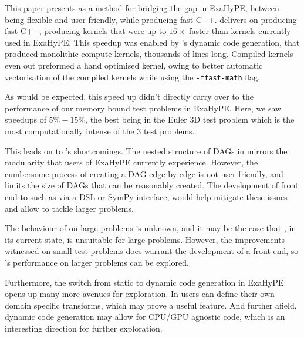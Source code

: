 This paper presents \phlat as a method for bridging the gap in ExaHyPE, between being flexible and user-friendly, while producing fast C++.
\phlat delivers on producing fast C++, producing kernels that were up to $16\times$ faster than kernels currently used in ExaHyPE.
This speedup was enabled by \phlat{}'s dynamic code generation, that produced monolithic compute kernels, thousands of lines long.
Compiled kernels even out preformed a hand optimised kernel, owing to better automatic vectorisation of the compiled kernels while using the \texttt{-ffast-math} flag.

As would be expected, this speed up didn't directly carry over to the performance of our memory bound test problems in ExaHyPE.
Here, we saw speedups of $5\% - 15\%$, the best being in the Euler 3D test problem which is the most computationally intense of the 3 test problems.

This leads on to \phlat{}'s shortcomings.
The nested structure of DAGs in \phlat mirrors the modularity that users of ExaHyPE currently experience.
However, the cumbersome process of creating a DAG edge by edge is not user friendly, and limits the size of DAGs that can be reasonably created.
The development of front end to \phlat such as via a DSL or SymPy interface, would help mitigate these issues and allow \phlat to tackle larger problems.

The behaviour of \phlat on large problems is unknown, and it may be the case that \phlat, in its current state, is unsuitable for large problems.
However, the improvements witnessed on small test problems does warrant the development of a front end, so \phlat{}'s performance on larger problems can be explored.

Furthermore, the switch from static to dynamic code generation in ExaHyPE opens up many more avenues for exploration.
In \phlat users can define their own domain specific transforms, which may prove a useful feature.
And further afield, dynamic code generation may allow for CPU/GPU agnostic code, which is an interesting direction for further exploration.


